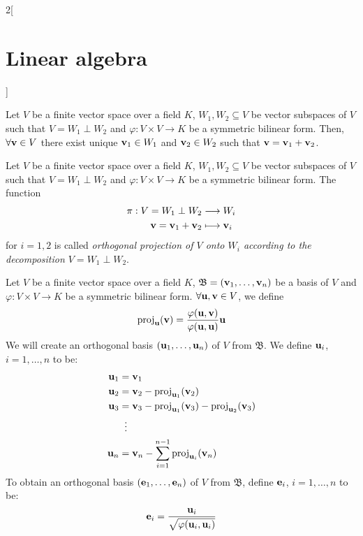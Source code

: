 \documentclass[../../../main.tex]{subfiles}
\begin{document}
\begin{multicols}{2}[\section{Linear algebra}]
\begin{definition}
  \end{definition}
  \begin{prop}
    Let $V$ be a finite vector space over a field $K$, $W_1,W_2\subseteq V$ be vector subspaces of $V$ such that $V=W_1\perp W_2$ and $\varphi:V\times V\rightarrow K$ be a symmetric bilinear form. Then, $\forall \vb{v}\in V$ there exist unique $\vb{v}_1\in W_1$ and $\vb{v}_2\in W_2$ such that $\vb{v}=\vb{v}_1+\vb{v}_2$.
  \end{prop}
  \begin{definition}\label{perpendicular}
    Let $V$ be a finite vector space over a field $K$, $W_1,W_2\subseteq V$ be vector subspaces of $V$ such that $V=W_1\perp W_2$ and $\varphi:V\times V\rightarrow K$ be a symmetric bilinear form. The function
    \begin{align*}
      \pi:V=W_1\perp W_2                            & \longrightarrow W_i         \\
      \vb{v}=\vb{v}_1+\vb{v}_2 & \longmapsto \vb{v}_i
    \end{align*}
    for $i=1,2$ is called \textit{orthogonal projection of $V$ onto $W_i$ according to the decomposition $V=W_1\perp W_2$}.
  \end{definition}
  \begin{method}
    Let $V$ be a finite vector space over a field $K$, $\mathfrak{B}=(\vb{v}_1,\ldots,\vb{v}_n)$ be a basis of $V$ and $\varphi:V\times V\rightarrow K$ be a symmetric bilinear form. $\forall\vb{u},\vb{v}\in V$, we define $$\text{proj}_{\vb{u}}(\vb{v})=\frac{\varphi(\vb{u},\vb{v})}{\varphi(\vb{u},\vb{u})}\vb{u}$$ We will create an orthogonal basis $(\vb{u}_1,\ldots,\vb{u}_n)$ of $V$ from $\mathfrak{B}$. We define $\vb{u}_i$, $i=1,\ldots,n$ to be:
    \begin{align*}
      \vb{u}_1 & =\vb{v}_1                                                                                               \\
      \vb{u}_2 & =\vb{v}_2-\text{proj}_{\vb{u}_1}(\vb{v}_2)                                                \\
      \vb{u}_3 & =\vb{v}_3-\text{proj}_{\vb{u}_1}(\vb{v}_3)-\text{proj}_{\vb{u}_2}(\vb{v}_3) \\
                      & \;\;\vdots                                                                                                     \\
      \vb{u}_n & =\vb{v}_n-\sum_{i=1}^{n-1}\text{proj}_{\vb{u}_i}(\vb{v}_n)
    \end{align*}
    To obtain an orthogonal basis $(\vb{e}_1,\ldots,\vb{e}_n)$ of $V$ from $\mathfrak{B}$, define $\vb{e}_i$, $i=1,\ldots,n$ to be: $$\vb{e}_i=\frac{\vb{u}_i}{\sqrt{\varphi(\vb{u}_i,\vb{u}_i)}}$$
  \end{method}

\end{multicols}
\end{document}
